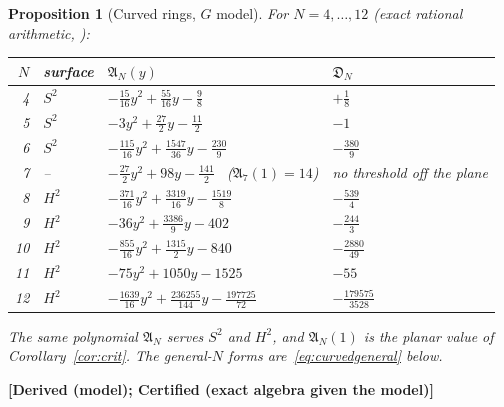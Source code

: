 \documentclass[11pt]{article}
\newtheorem{proposition}[theorem]{Proposition}
\theoremstyle{definition}
\theoremstyle{remark}
\newcommand{\code}[1]{\path{#1}}
\newcommand{\status}[1]{\textbf{[#1]}}
\begin{document}
\begin{proposition}[Curved rings, $G$ model]\label{prop:curved}
For $N=4,\dots,12$ (exact rational arithmetic, \code{code/curved.py}):
\begin{center}\small
\begin{tabular}{rlll}\toprule
$N$&surface&$\mathfrak A_N(y)$&$\mathfrak D_N$\\\midrule
4&$S^2$&$-\frac{15}{16}y^2+\frac{55}{16}y-\frac98$&$+\frac18$\\
5&$S^2$&$-3y^2+\frac{27}2y-\frac{11}2$&$-1$\\
6&$S^2$&$-\frac{115}{16}y^2+\frac{1547}{36}y-\frac{230}9$&$-\frac{380}9$\\
7&--&$-\frac{27}2y^2+98y-\frac{141}2$ \ ($\mathfrak A_7(1)=14$)&no threshold off the plane\\
8&$H^2$&$-\frac{371}{16}y^2+\frac{3319}{16}y-\frac{1519}8$&$-\frac{539}4$\\
9&$H^2$&$-36y^2+\frac{3386}9y-402$&$-\frac{244}3$\\
10&$H^2$&$-\frac{855}{16}y^2+\frac{1315}2y-840$&$-\frac{2880}{49}$\\
11&$H^2$&$-75y^2+1050y-1525$&$-55$\\
12&$H^2$&$-\frac{1639}{16}y^2+\frac{236255}{144}y-\frac{197725}{72}$&$-\frac{179575}{3528}$\\\bottomrule
\end{tabular}
\end{center}
The same polynomial $\mathfrak A_N$ serves $S^2$ and $H^2$, and $\mathfrak A_N(1)$ is the planar value of
Corollary~\ref{cor:crit}. The general-$N$ forms are~\eqref{eq:curvedgeneral} below.
\end{proposition}
\noindent\status{Derived (model); Certified (exact algebra given the model)}
\end{document}
